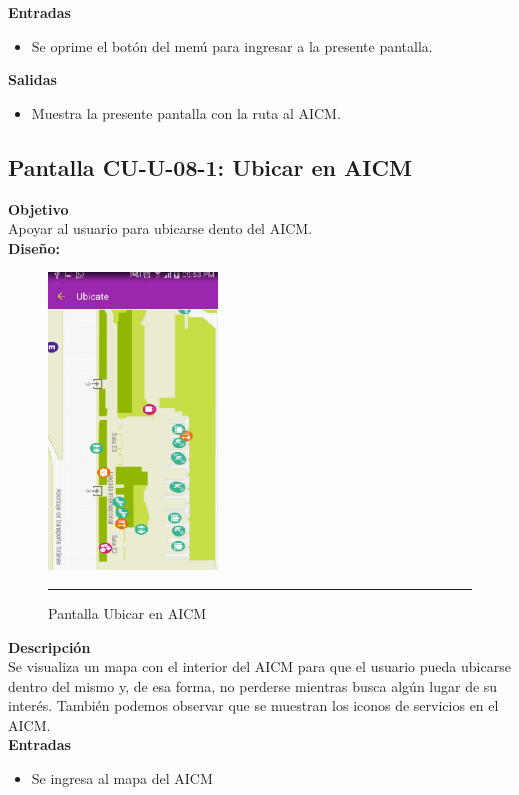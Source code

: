 \textbf{Entradas}
\begin{itemize}
\item Se oprime el botón del menú para ingresar a la presente pantalla.
\end{itemize}

\textbf{Salidas}
\begin{itemize}
\item Muestra la presente pantalla con la ruta al AICM.
\end{itemize}
\clearpage
\hypertarget{CU-U-08-1}{}
\subsection{Pantalla CU-U-08-1: Ubicar en AICM}
\textbf{Objetivo}\\
Apoyar al usuario para ubicarse dento del AICM. \\

\textbf{Diseño:}
\begin{figure}[h]
	\centering
		\includegraphics[width=0.4\textwidth]{Figuras/intUbicarAICM.png}
		\rule{30em}{0.5pt}
	\caption[Pantalla Ubicar en AICM]{Pantalla Ubicar en AICM}
	\label{fig:intUbicarAICM}
\end{figure}

\textbf{Descripción} \\
Se visualiza un mapa con el interior del AICM para que el usuario pueda ubicarse dentro del mismo y, de esa forma, no perderse mientras busca algún lugar de su interés. También podemos observar que se muestran los iconos de servicios en el AICM. \\

\textbf{Entradas}
\begin{itemize}
\item Se ingresa al mapa del AICM
\end{itemize}

